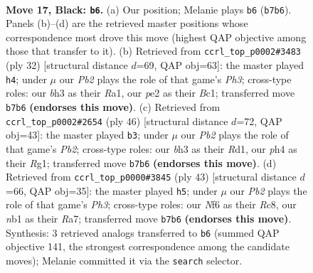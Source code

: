\documentclass[11pt]{article}
\begin{document}
\clearpage

\begin{figure}[p]\centering
\begin{subfigure}{0.46\textwidth}\centering
\resizebox{\linewidth}{!}{%
\newchessgame
\chessboard[
  setfen={r1br2k1/1pp3bp/5np1/PP3p2/4pP1P/6PB/4P3/RNB2RK1 b - - 2 17},
  showmover=false,
  pgfstyle=straightmove, color=movearrow, markmove={b7-b6}
]}
\caption{}
\end{subfigure}\hfill
\begin{subfigure}{0.46\textwidth}\centering
\resizebox{\linewidth}{!}{%
\newchessgame
\chessboard[
  setfen={r3k2r/ppn1p1b1/2p3p1/4Pb1p/2P2P2/2N4P/1P2B1P1/R1B2RK1 w kq - 0 17},
  showmover=false,
  pgfstyle=straightmove, color=movearrow, markmove={h3-h4}
]}
\caption{}
\end{subfigure}
\\[4pt]
\begin{subfigure}{0.46\textwidth}\centering
\resizebox{\linewidth}{!}{%
\newchessgame
\chessboard[
  setfen={r6r/2kbnpp1/p2pp3/6Pn/Pp2PP2/4B3/1PP1N3/2KR1BR1 w - - 2 24},
  showmover=false,
  pgfstyle=straightmove, color=movearrow, markmove={b2-b3}
]}
\caption{}
\end{subfigure}\hfill
\begin{subfigure}{0.46\textwidth}\centering
\resizebox{\linewidth}{!}{%
\newchessgame
\chessboard[
  setfen={2r3k1/r4p2/1p2pn1p/pBnb2p1/P7/2P1P2P/1P1N2PB/R2R2K1 b - - 3 22},
  showmover=false,
  pgfstyle=straightmove, color=movearrow, markmove={h6-h5}
]}
\caption{}
\end{subfigure}
\caption{\textbf{Move 17, Black: \texttt{b6}.} (a) Our position; Melanie plays \texttt{b6} (\texttt{b7b6}). Panels (b)--(d) are the retrieved master positions whose correspondence most drove this move (highest QAP objective among those that transfer to it). (b) Retrieved from \texttt{ccrl\_top\_p0002\#3483} (ply 32) [structural distance $d$=69, QAP obj=63]: the master played \texttt{h4}; under $\mu$ our \emph{Pb2} plays the role of that game's \emph{Ph3}; cross-type roles: our \emph{b}h3 as their \emph{R}a1, our \emph{p}e2 as their \emph{B}c1; transferred move \texttt{b7b6} \textbf{(endorses this move)}. (c) Retrieved from \texttt{ccrl\_top\_p0002\#2654} (ply 46) [structural distance $d$=72, QAP obj=43]: the master played \texttt{b3}; under $\mu$ our \emph{Pb2} plays the role of that game's \emph{Pb2}; cross-type roles: our \emph{b}h3 as their \emph{R}d1, our \emph{p}h4 as their \emph{R}g1; transferred move \texttt{b7b6} \textbf{(endorses this move)}. (d) Retrieved from \texttt{ccrl\_top\_p0000\#3845} (ply 43) [structural distance $d$=66, QAP obj=35]: the master played \texttt{h5}; under $\mu$ our \emph{Pb2} plays the role of that game's \emph{Ph3}; cross-type roles: our \emph{N}f6 as their \emph{R}c8, our \emph{n}b1 as their \emph{R}a7; transferred move \texttt{b7b6} \textbf{(endorses this move)}. Synthesis: 3 retrieved analogs transferred to \texttt{b6} (summed QAP objective 141, the strongest correspondence among the candidate moves); Melanie committed it via the \texttt{search} selector.}
\label{fig:thought-m33}
\end{figure}
\end{document}
